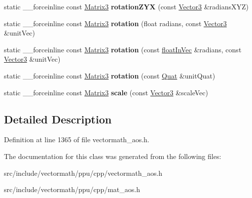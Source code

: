 \begin{DoxyCompactItemize}
\item 
\hypertarget{classVectormath_1_1Aos_1_1Matrix3_aa8b17add8626797be242c504439dfa25}{static \-\_\-\-\_\-forceinline const \hyperlink{classVectormath_1_1Aos_1_1Matrix3}{Matrix3} {\bfseries rotation\-Z\-Y\-X} (const \hyperlink{classVectormath_1_1Aos_1_1Vector3}{Vector3} \&radians\-X\-Y\-Z)}\label{classVectormath_1_1Aos_1_1Matrix3_aa8b17add8626797be242c504439dfa25}

\item 
\hypertarget{classVectormath_1_1Aos_1_1Matrix3_ab861fcd0ca97786e39b39fda8d431777}{static \-\_\-\-\_\-forceinline const \hyperlink{classVectormath_1_1Aos_1_1Matrix3}{Matrix3} {\bfseries rotation} (float radians, const \hyperlink{classVectormath_1_1Aos_1_1Vector3}{Vector3} \&unit\-Vec)}\label{classVectormath_1_1Aos_1_1Matrix3_ab861fcd0ca97786e39b39fda8d431777}

\item 
\hypertarget{classVectormath_1_1Aos_1_1Matrix3_ad171c46dd0964a4a0801ef5504d248f4}{static \-\_\-\-\_\-forceinline const \hyperlink{classVectormath_1_1Aos_1_1Matrix3}{Matrix3} {\bfseries rotation} (const \hyperlink{classVectormath_1_1floatInVec}{float\-In\-Vec} \&radians, const \hyperlink{classVectormath_1_1Aos_1_1Vector3}{Vector3} \&unit\-Vec)}\label{classVectormath_1_1Aos_1_1Matrix3_ad171c46dd0964a4a0801ef5504d248f4}

\item 
\hypertarget{classVectormath_1_1Aos_1_1Matrix3_a57a86f92969694a2fdf85e7088c5e331}{static \-\_\-\-\_\-forceinline const \hyperlink{classVectormath_1_1Aos_1_1Matrix3}{Matrix3} {\bfseries rotation} (const \hyperlink{classVectormath_1_1Aos_1_1Quat}{Quat} \&unit\-Quat)}\label{classVectormath_1_1Aos_1_1Matrix3_a57a86f92969694a2fdf85e7088c5e331}

\item 
\hypertarget{classVectormath_1_1Aos_1_1Matrix3_a28aa3a199ae46660d1566c34f1fc3626}{static \-\_\-\-\_\-forceinline const \hyperlink{classVectormath_1_1Aos_1_1Matrix3}{Matrix3} {\bfseries scale} (const \hyperlink{classVectormath_1_1Aos_1_1Vector3}{Vector3} \&scale\-Vec)}\label{classVectormath_1_1Aos_1_1Matrix3_a28aa3a199ae46660d1566c34f1fc3626}

\end{DoxyCompactItemize}


\subsection{Detailed Description}


Definition at line 1365 of file vectormath\-\_\-aos.\-h.



The documentation for this class was generated from the following files\-:\begin{DoxyCompactItemize}
\item 
src/include/vectormath/ppu/cpp/vectormath\-\_\-aos.\-h\item 
src/include/vectormath/ppu/cpp/mat\-\_\-aos.\-h\end{DoxyCompactItemize}
